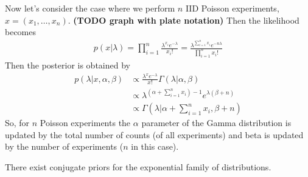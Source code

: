 Now let's consider the case where we perform $n$ IID Poisson experiments, $x=(x_1, \dots, x_n)$. \textbf{(TODO graph with plate notation)} Then the likelihood becomes
\begin{align}
p(x|\lambda)= \prod _{i=1} ^n \frac{\lambda^{x_i} e^{-\lambda}}{x_i!}
=  \frac{\lambda^{\sum_{i=1}^n x_i} e^{-n \lambda}}{\prod _{i=1} ^n x_i!}
\end{align}
Then the posterior is obtained by
\begin{align}
p(\lambda|x, \alpha, \beta)  
&\propto  \frac{\lambda^x e^{-\lambda}}{x!} \Gamma(\lambda|\alpha, \beta) \\
&\propto  \lambda^{(\alpha + \sum_{i=1}^n x_i) - 1} e ^ {\lambda (\beta + n)} \\
&\propto \Gamma(\lambda | \alpha + \sum_{i=1}^n x_i, \beta +n)
\end{align}
So, for $n$ Poisson experiments the $\alpha$ parameter of the Gamma distribution is updated by the total number of counts (of all experiments) and beta is updated by the number of experiments ($n$ in this case).
\begin{theorem}
There exist conjugate priors for the exponential family of distributions.
\end{theorem}
